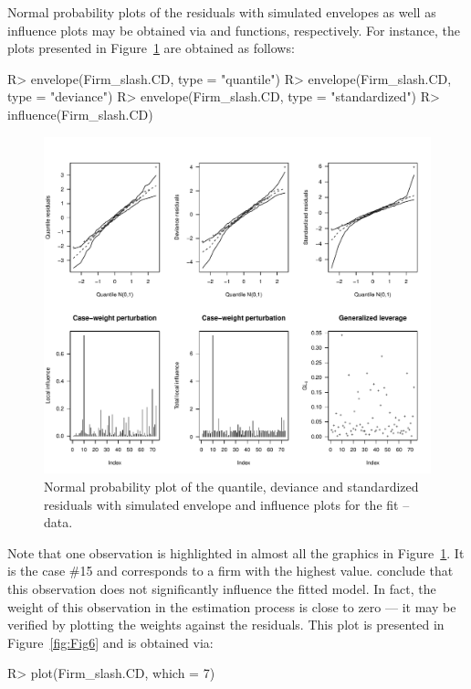 Normal probability plots of the residuals with simulated envelopes as well as influence plots may be obtained via  and  functions, respectively. For instance, the plots presented in Figure~\ref{fig:Fig5} are obtained as follows:
\begin{Schunk}
\begin{Sinput}
R> envelope(Firm_slash.CD, type = "quantile")
R> envelope(Firm_slash.CD, type = "deviance")
R> envelope(Firm_slash.CD, type = "standardized")
R> influence(Firm_slash.CD)
\end{Sinput}
\end{Schunk}

\begin{figure}[t!]
\centering
\includegraphics[scale=0.7]{figures/Fig5.pdf}
\caption{\label{fig:Fig5} Normal probability plot of the quantile, deviance and standardized residuals with simulated envelope and influence plots for the  fit --  data.}
\end{figure}

Note that one observation is highlighted in almost all the graphics in Figure~\ref{fig:Fig5}. It is the case \#15 and corresponds to a firm with
the highest  value. \cite{QueirozFerrari2023} conclude that this observation does not significantly influence the fitted model. In fact, the weight of this observation in the estimation process is close to zero --- it may be verified by plotting the weights against the residuals. This plot is presented in Figure~\ref{fig:Fig6} and is obtained via:
\begin{Schunk}
\begin{Sinput}
R> plot(Firm_slash.CD, which = 7)
\end{Sinput}
\end{Schunk}

